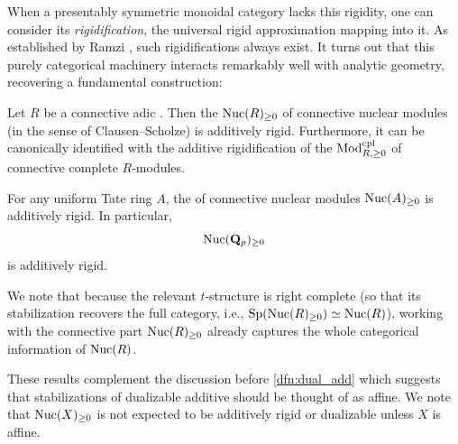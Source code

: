 \documentclass[a4paper,10pt, oneside]{amsart}
\begin{document}
When a presentably symmetric monoidal category lacks this rigidity, one can consider its \emph{rigidification}, the universal rigid approximation mapping into it. As established by Ramzi \cite[Corollary 4.73]{ramzi2024locally}, such rigidifications always exist. 
 It turns out that this purely categorical machinery interacts remarkably well with analytic geometry, recovering a fundamental construction:
\begin{thmX}\label{mmain5}
	Let $R$ be a connective adic \einfring. Then the \infcat $\mathrm{Nuc}(R)_{\geq 0}$ of connective nuclear modules (in the sense of Clausen--Scholze) is additively rigid. Furthermore, it can be canonically identified with the additive rigidification of the \infcat $\mathrm{Mod}_{R,\geq 0}^{\mathrm{cpl}}$ of connective complete $R$-modules. 	
\end{thmX}
\begin{corX}
	For any uniform Tate ring $A$, the \infcat of connective nuclear modules $\mathrm{Nuc}(A)_{\geq0}$ is  additively rigid. In particular, $$\mathrm{Nuc}(\mathbf{Q}_p)_{\geq0}$$ is  additively rigid.
\end{corX}
We note that because the relevant $t$-structure is right complete (so that its stabilization recovers the full category, i.e., $\mathrm{Sp}(\mathrm{Nuc}(R)_{\geq 0}) \simeq \mathrm{Nuc}(R)$), working with the connective part $\mathrm{Nuc}(R)_{\geq 0}$ already captures the whole categorical information of $\mathrm{Nuc}(R)$.

These results complement the discussion before \cref{dfn:dual_add} which suggests that stabilizations of dualizable additive \infcats should be thought of as affine. We note that  
$\mathrm{Nuc}(X)_{\geq0}$ is not expected to be additively rigid or dualizable unless $X$ is affine. 
\end{document}
